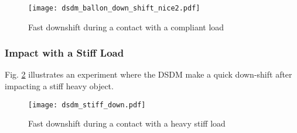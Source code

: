 %
%

\begin{figure}[htp]
	\centering
		\texttt{[image: dsdm\_ballon\_down\_shift\_nice2.pdf]}
	\caption{ Fast downshift during a contact with a compliant load }
	\label{fig:dsdm_ballon_down_shift_nice2}
\end{figure}



\subsubsection{Impact with a Stiff Load}

Fig. \ref{fig:dsdm_stiff_down} illustrates an experiment where the DSDM make a quick down-shift after impacting a stiff heavy object. 

\begin{figure}[htp]
	\centering
		\texttt{[image: dsdm\_stiff\_down.pdf]}
	\caption{ Fast downshift during a contact with a heavy stiff load }
	\label{fig:dsdm_stiff_down}
\end{figure}

%
%
%
